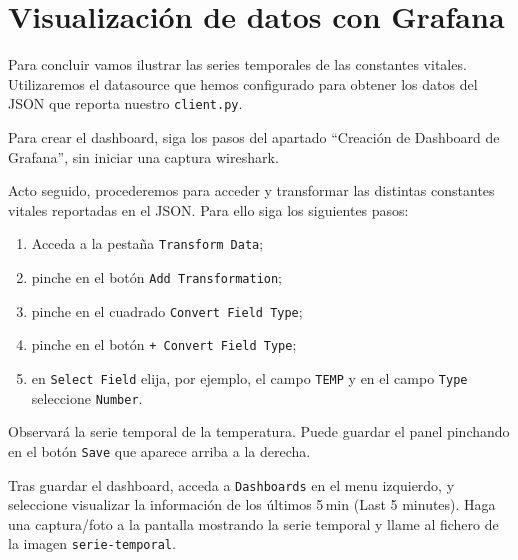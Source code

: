 \documentclass{upmassignment}
\begin{document}
\section*{Visualización de datos con Grafana}
Para concluir vamos ilustrar las series
temporales de las constantes vitales.
Utilizaremos el datasource que hemos
configurado para obtener los datos del JSON
que reporta nuestro \texttt{client.py}.

Para crear el dashboard, siga
los pasos del apartado
``Creación de Dashboard de Grafana'',
sin iniciar una captura wireshark.

Acto seguido, procederemos para acceder
y transformar las distintas constantes vitales
reportadas en el JSON. Para ello siga
los siguientes pasos:
\begin{enumerate}
    \item Acceda a la pestaña
        \texttt{Transform Data};
    \item pinche en el botón
        \texttt{Add Transformation};
    \item pinche en el cuadrado
        \texttt{Convert Field Type};
    \item pinche en el botón
        \texttt{+ Convert Field Type};
    \item en \texttt{Select Field}
        elija, por ejemplo, el campo
        \texttt{TEMP} y en el campo
        \texttt{Type} seleccione
        \texttt{Number}.
\end{enumerate}
Observará la serie temporal de la temperatura.
Puede guardar el panel pinchando en el botón
\texttt{Save} que aparece arriba a la derecha.

\begin{problemlist}
    \setcounter{enumi}{8}
    \pbitem Tras guardar el dashboard,
        acceda a \texttt{Dashboards} en el
        menu izquierdo, y seleccione visualizar
        la información de los últimos
        5\,\textrm{min} (Last 5 minutes).
        Haga una captura/foto a la
        pantalla mostrando la serie temporal y
        llame al fichero de la imagen
        \texttt{serie-temporal}.
\end{problemlist}
\end{document}

